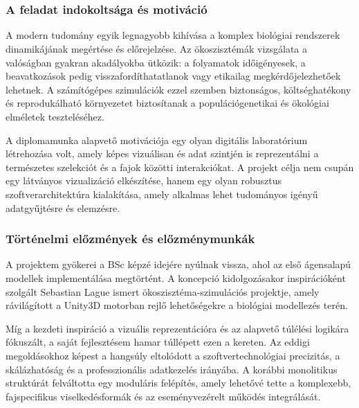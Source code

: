\chapter{\bevezetes}

\subsection{A feladat indokoltsága és motiváció}
A modern tudomány egyik legnagyobb kihívása a komplex biológiai rendszerek dinamikájának megértése és előrejelzése. Az ökoszisztémák vizsgálata a valóságban gyakran akadályokba ütközik: a folyamatok időigényesek, a beavatkozások pedig visszafordíthatatlanok vagy etikailag megkérdőjelezhetőek lehetnek. A számítógépes szimulációk ezzel szemben biztonságos, költséghatékony és reprodukálható környezetet biztosítanak a populációgenetikai és ökológiai elméletek teszteléséhez.

A diplomamunka alapvető motivációja egy olyan digitális laboratórium létrehozása volt, amely képes vizuálisan és adat szintjén is reprezentálni a természetes szelekciót és a fajok közötti interakciókat. A projekt célja nem csupán egy látványos vizualizáció elkészítése, hanem egy olyan robusztus szoftverarchitektúra kialakítása, amely alkalmas lehet tudományos igényű adatgyűjtésre és elemzésre.

\subsection{Történelmi előzmények és előzménymunkák}
A projektem gyökerei a BSc képzé idejére nyúlnak vissza, ahol az első ágensalapú modellek implementálása megtörtént. A koncepció kidolgozásakor inspirációként szolgált Sebastian Lague ismert ökoszisztéma-szimulációs projektje, amely rávilágított a Unity3D motorban rejlő lehetőségekre a biológiai modellezés terén.

Míg a kezdeti inspiráció a vizuális reprezentációra és az alapvető túlélési logikára fókuszált, a saját fejlesztésem hamar túllépett ezen a kereten. Az eddigi megoldásokhoz képest a hangsúly eltolódott a szoftvertechnológiai precizitás, a skálázhatóság és a professzionális adatkezelés irányába. A korábbi monolitikus struktúrát felváltotta egy moduláris felépítés, amely lehetővé tette a komplexebb, fajspecifikus viselkedésformák és az eseményvezérelt működés integrálását.

